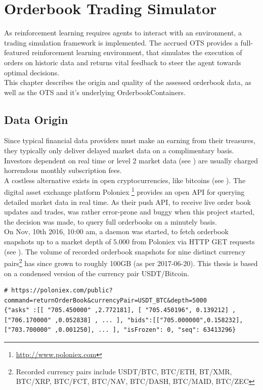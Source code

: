 \chapter{Orderbook Trading Simulator}
\label{chap:simulator}
As reinforcement learning requires agents to interact with an environment, a trading simulation framework is implemented. The accrued \acf{OTS} provides a full-featured reinforcement learning environment, that simulates the execution of orders on historic data and returns vital feedback to steer the agent towards optimal decisions.\\

This chapter describes the origin and quality of the assessed orderbook data, as well as the \ac{OTS} and it's underlying OrderbookContainers.


\section{Data Origin}
\label{chap:dataorigin}
Since typical financial data providers must make an earning from their treasures, they typically only deliver delayed market data on a complimentary basis. Investors dependent on real time or level 2 market data (see ) are usually charged horrendous monthly subscription fees.\\

A costless alternative exists in open cryptocurrencies, like bitcoins (see ). The digital asset exchange platform Poloniex \footnote{\url{http://www.poloniex.com}} provides an open API for querying detailed market data in real time. As their push API, to receive live order book updates and trades, was rather error-prone and buggy when this project started, the decision was made, to query full orderbooks on a minutely basis.\\

On Nov, 10th 2016, 10:00 am, a daemon was started, to fetch orderbook snapshots up to a market depth of $5.000$ from Poloniex via HTTP GET requests (see ). The volume of recorded orderbook snapshots for nine distinct currency pairs\footnote{Recorded currency pairs include USDT/BTC, BTC/ETH, BT/XMR, BTC/XRP, BTC/FCT, BTC/NAV, BTC/DASH, BTC/MAID, BTC/ZEC} has since grown to roughly 100GB (as per 2017-06-20). This thesis is based on a condensed version of the currency pair USDT/Bitcoin.

\begin{lstlisting}[frame=single, breaklines=true, basicstyle=\scriptsize, caption=Data fetched from Poloniex via HTTP GET request, label=lst:PoloniexFetch]
# https://poloniex.com/public?command=returnOrderBook&currencyPair=USDT_BTC&depth=5000
{"asks" :[[ "705.450000" ,2.772181], [ "705.450196", 0.139212] ,["706.170000" ,0.052838] , ... ], "bids":[["705.000000",0.158232],["703.700000" ,0.001250], ... ], "isFrozen": 0, "seq": 63413296}
\end{lstlisting}

